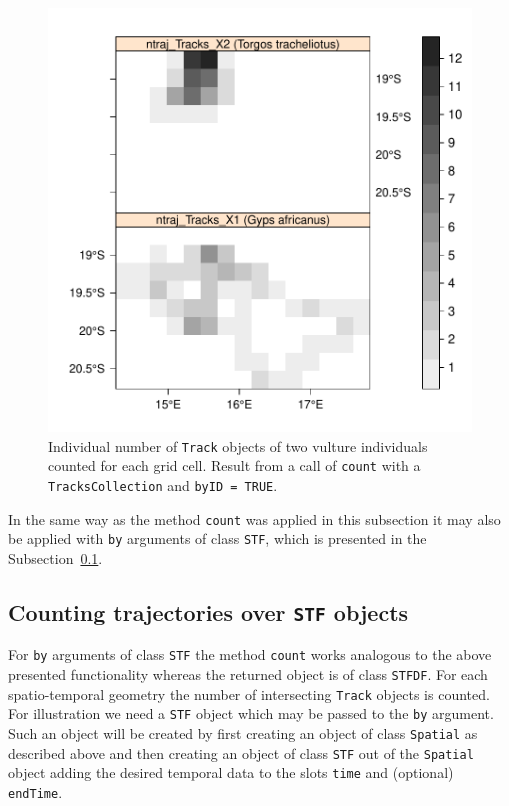 \documentclass[12pt, oneside, a4paper]{scrbook}
\let\code=\texttt
\newcommand{\codeintitles}[1]{{\tt #1}} %
\begin{document}
\begin{figure}[!htb]
\centering
\includegraphics{trajagg-count_sp_vulture_TrC_fig_1}
\caption[Individual number of \code{Track} objects of two vultures counted over spatial geometries.]{Individual number of \code{Track} objects of two vulture individuals counted for each grid cell. Result from a call of \code{count} with a \code{TracksCollection} and \code{byID = TRUE}.}
\label{fig:countvulturetrcbyidoversp}
\end{figure}

\par\medskip

In the same way as the method \code{count} was applied in this subsection it  may also be applied with \code{by} arguments of class \code{STF}, which is presented in the Subsection~\ref{subsec:countoverstf}.

\par\medskip


\subsection{Counting trajectories over \codeintitles{STF} objects}
\label{subsec:countoverstf}

For \code{by} arguments of class \code{STF} the method \code{count} works analogous to the above presented functionality whereas the returned object is of class \code{STFDF}. For each spatio-temporal geometry the number of intersecting \code{Track} objects is counted. For illustration we need a \code{STF} object which may be passed to the \code{by} argument. Such an object  will be created by first creating an object of class \code{Spatial} as described above and then creating an object of class \code{STF} out of the \code{Spatial} object adding the desired temporal data to the slots \code{time} and (optional) \code{endTime}.
\par\medskip
\end{document}
